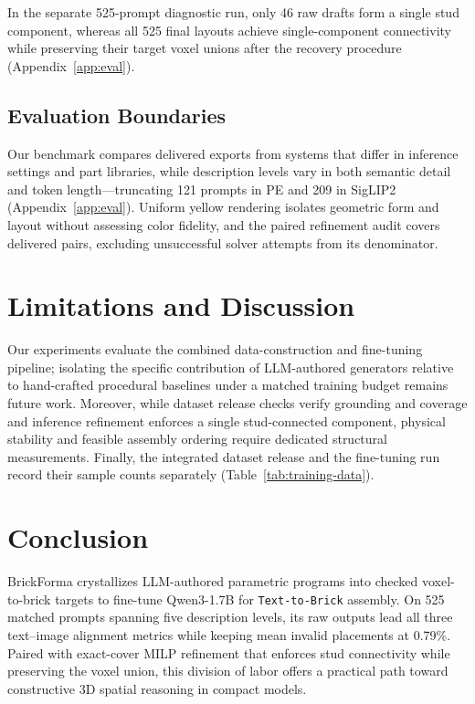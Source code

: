 \documentclass[letterpaper]{article} %
\begin{document}
In the separate 525-prompt diagnostic run, only 46 raw drafts form a single stud component, whereas all 525 final layouts achieve single-component connectivity while preserving their target voxel unions after the recovery procedure (Appendix~\ref{app:eval}).

\subsection{Evaluation Boundaries}
Our benchmark compares delivered exports from systems that differ in inference settings and part libraries, while description levels vary in both semantic detail and token length---truncating 121 prompts in PE and 209 in SigLIP2 (Appendix~\ref{app:eval}). Uniform yellow rendering isolates geometric form and layout without assessing color fidelity, and the paired refinement audit covers delivered pairs, excluding unsuccessful solver attempts from its denominator.

\section{Limitations and Discussion}
Our experiments evaluate the combined data-construction and fine-tuning pipeline; isolating the specific contribution of LLM-authored generators relative to hand-crafted procedural baselines under a matched training budget remains future work. Moreover, while dataset release checks verify grounding and coverage and inference refinement enforces a single stud-connected component, physical stability and feasible assembly ordering require dedicated structural measurements. Finally, the integrated dataset release and the fine-tuning run record their sample counts separately (Table~\ref{tab:training-data}).

\section{Conclusion}
BrickForma crystallizes LLM-authored parametric programs into checked voxel-to-brick targets to fine-tune Qwen3-1.7B for \texttt{Text-to-Brick} assembly. On 525 matched prompts spanning five description levels, its raw outputs lead all three text--image alignment metrics while keeping mean invalid placements at 0.79\%. Paired with exact-cover MILP refinement that enforces stud connectivity while preserving the voxel union, this division of labor offers a practical path toward constructive 3D spatial reasoning in compact models.
\end{document}

